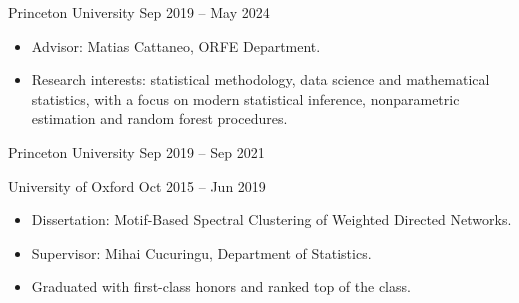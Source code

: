 \documentclass[
  date,
  number,
]{wgu-cv}
\begin{document}
\maketitle


\setlength{\emergencystretch}{2pt}


{Princeton University}
{Sep 2019 -- May 2024}

\begin{itemize}
  \item Advisor:
    Matias Cattaneo, ORFE Department.
  \item Research interests:
    statistical methodology,
    data science and
    mathematical statistics,
    with a focus on
    modern statistical inference,
    nonparametric estimation
    and random forest procedures.
\end{itemize}

{Princeton University}
{Sep 2019 -- Sep 2021}

\bigskip

{University of Oxford}
{Oct 2015 -- Jun 2019}

\begin{itemize}
  \item Dissertation:
    Motif-Based Spectral Clustering of Weighted Directed Networks.
  \item Supervisor:
    Mihai Cucuringu,
    Department of Statistics.
  \item Graduated with first-class honors and ranked top of the class.
\end{itemize}

\vspace*{-4mm}

\end{document}
